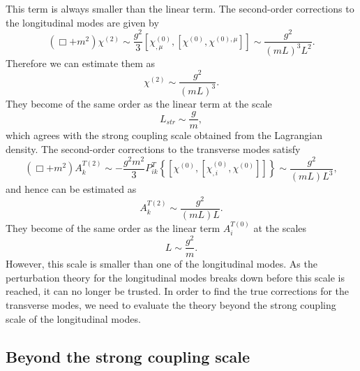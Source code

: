 \documentclass{article}
\begin{document}
This term is always smaller than the linear term. The second-order corrections to the longitudinal modes are given by 
\begin{equation}
    \left(\Box+m^2\right)\chi^{(2)}\sim\frac{g^2}{3}\left[\chi^{(0)}_{,\mu},\left[\chi^{(0)},\chi^{(0),\mu}\right]\right]\sim\frac{g^2}{\left(mL\right)^3L^2}.
\end{equation}
Therefore we can estimate them as 
\begin{equation}
    \chi^{(2)}\sim\frac{g^2}{\left(mL\right)^3}.
\end{equation}
They become of the same order as the linear term at the scale
\begin{equation}
    L_{str}\sim\frac{g}{m},
\end{equation}
which agrees with the strong coupling scale obtained from the Lagrangian density. The second-order corrections to the transverse modes satisfy \begin{equation}
    \left(\Box+m^2\right)A_k^{T(2)}\sim-\frac{g^2m^2}{3}P_{ik}^T\left\{\left[\chi^{(0)},\left[\chi^{(0)}_{,i},\chi^{(0)}\right]\right]\right\}\sim\frac{g^2}{\left(mL\right)L^3},
\end{equation}
and hence can be estimated as 
\begin{equation}
    A_k^{T(2)}\sim\frac{g^2}{\left(mL\right)L}.
\end{equation}
They become of the same order as the linear term $A_i^{T(0)}$ at the scales
\begin{equation}
    L\sim\frac{g^2}{m}.
\end{equation}
However, this scale is smaller than one of the  longitudinal modes. As the perturbation theory for the longitudinal modes breaks down before this scale is reached, it can no longer be trusted. In order to find the true corrections for the transverse modes, we need to evaluate the theory beyond the strong coupling scale of the longitudinal modes.
\subsection{Beyond the strong coupling scale}
\end{document}
